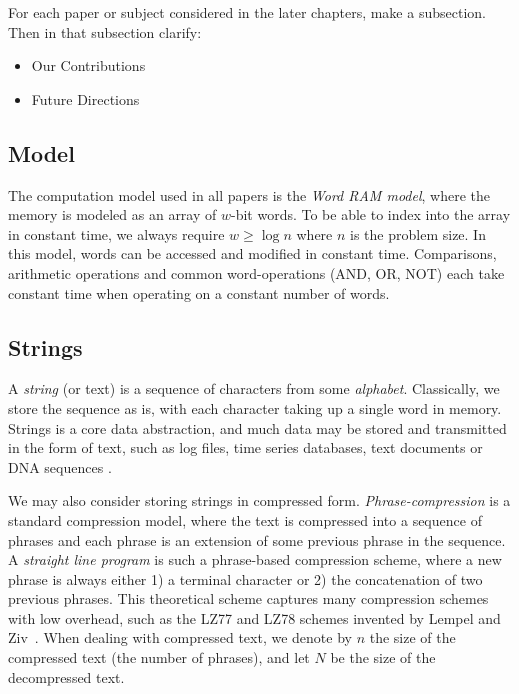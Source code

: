 

\begin{framed}
\noindent For each paper or subject considered in the later chapters, make a subsection. 
Then in that subsection clarify:
\begin{itemize}
    \item Our Contributions
    \item Future Directions
\end{itemize}
\end{framed}

\subsection{Model}
The computation model used in all papers is the \emph{Word RAM model}, where the memory is modeled as an array of $w$-bit words. To be able to index into the array in constant time, we always require $w \geq \log n$ where $n$ is the problem size. In this model, words can be accessed and modified in constant time. Comparisons, arithmetic operations and common word-operations (AND, OR, NOT) each take constant time when operating on a constant number of words. 


\subsection{Strings}
A \emph{string} (or text) is a sequence of characters from some \emph{alphabet}. Classically, we store the sequence as is, with each character taking up a single word in memory. Strings is a core data abstraction, and much data may be stored and transmitted in the form of text, such as log files, time series databases, text documents or DNA sequences . 

We may also consider storing strings in compressed form.
\emph{Phrase-compression} is a standard compression model, where the text is compressed into a sequence of phrases and each phrase is an extension of some previous phrase in the sequence. A \emph{straight line program} is such a phrase-based compression scheme, where a new phrase is always either 1) a terminal character or 2) the concatenation of two previous phrases.
This theoretical scheme captures many compression schemes with low overhead, such as the LZ77 and LZ78 schemes invented by Lempel and Ziv~\cite{lz77,lz78}. 
When dealing with compressed text, we denote by $n$ the size of the compressed text (the number of phrases), and let $N$ be the size of the decompressed text. 


